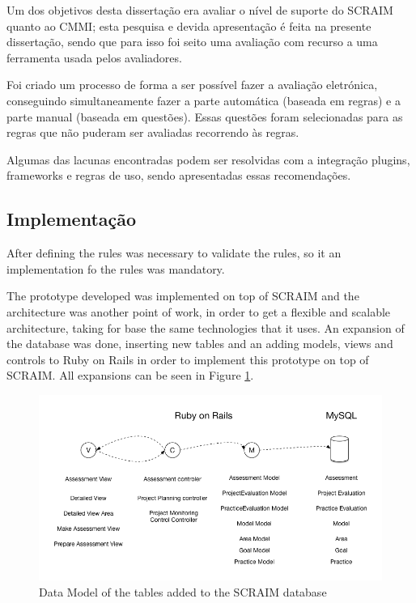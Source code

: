\documentclass[9pt,a4paper]{extarticle}
\begin{document}
\begin{multicols}{2}
Um dos objetivos desta dissertação era avaliar o nível de suporte do SCRAIM quanto ao CMMI; esta pesquisa e devida apresentação é feita na presente dissertação, sendo que para isso foi seito uma avaliação com recurso a uma ferramenta usada pelos avaliadores.

Foi criado um processo de forma a ser possível fazer a avaliação eletrónica, conseguindo simultaneamente fazer a parte automática (baseada em regras) e a parte manual (baseada em questões). Essas questões foram selecionadas para as regras que não puderam ser avaliadas recorrendo às regras.

Algumas das lacunas encontradas podem ser resolvidas com a integração plugins, frameworks e regras de uso, sendo apresentadas essas recomendações.


\subsection{Implementação}
After defining the rules was necessary to validate the rules, so it an implementation fo the rules was mandatory.

The prototype developed was implemented on top of SCRAIM and the architecture was another point of work, in order to get a flexible and scalable architecture, taking for base the same technologies that it uses.
An  expansion of the database was done, inserting new tables and an adding models, views and controls to Ruby on Rails in order to implement this prototype on top of SCRAIM. All expansions can be seen in  Figure \ref{fig:figura}.

\begin{figure}[H]
	\centerline{\includegraphics[scale=.3]{presentation.png}}
	\caption{Data Model of the tables added to the SCRAIM database}  
	\label{fig:figura}
\end{figure}


\end{multicols}
\end{document}
